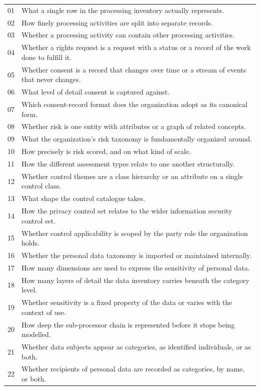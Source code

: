 \documentclass[10pt,letterpaper,twocolumn,twoside]{rho-class/rho}
\begin{document}
\begin{small}
\begin{longtable}{@{}p{} p{}@{}}
01 & What a single row in the processing inventory actually represents. \\
02 & How finely processing activities are split into separate records. \\
03 & Whether a processing activity can contain other processing activities. \\
04 & Whether a rights request is a request with a status or a record of the work done to fulfill it. \\
05 & Whether consent is a record that changes over time or a stream of events that never changes. \\
06 & What level of detail consent is captured against. \\
07 & Which consent-record format does the organization adopt as its canonical form. \\
08 & Whether risk is one entity with attributes or a graph of related concepts. \\
09 & What the organization's risk taxonomy is fundamentally organized around. \\
10 & How precisely is risk scored, and on what kind of scale. \\
11 & How the different assessment types relate to one another structurally. \\
12 & Whether control themes are a class hierarchy or an attribute on a single control class. \\
13 & What shape the control catalogue takes. \\
14 & How the privacy control set relates to the wider information security control set. \\
15 & Whether control applicability is scoped by the party role the organization holds. \\
16 & Whether the personal data taxonomy is imported or maintained internally. \\
17 & How many dimensions are used to express the sensitivity of personal data. \\
18 & How many layers of detail the data inventory carries beneath the category level. \\
19 & Whether sensitivity is a fixed property of the data or varies with the context of use. \\
20 & How deep the sub-processor chain is represented before it stops being modelled. \\
21 & Whether data subjects appear as categories, as identified individuals, or as both. \\
22 & Whether recipients of personal data are recorded as categories, by name, or both. \\

\end{longtable}
\end{small}
\end{document}
